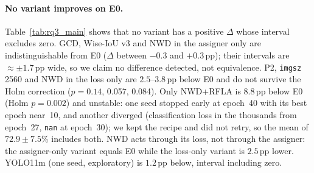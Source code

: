 \paragraph{No variant improves on E0.}
Table~\ref{tab:rq3_main} shows that no variant has a positive $\Delta$ whose interval excludes zero. GCD, Wise-IoU v3 and NWD in the assigner only are indistinguishable from E0 ($\Delta$ between $-0.3$ and $+0.3$\,pp); their intervals are $\approx\pm1.7$\,pp wide, so we claim no difference detected, not equivalence. P2, \texttt{imgsz} 2560 and NWD in the loss only are $2.5$--$3.8$\,pp below E0 and do not survive the Holm correction ($p=0.14$, 0.057, 0.084). Only NWD+RFLA is $8.8$\,pp below E0 (Holm $p=0.002$) and unstable: one seed stopped early at epoch~40 with its best epoch near~10, and another diverged (classification loss in the thousands from epoch~27, \texttt{nan} at epoch~30); we kept the recipe and did not retry, so the mean of $72.9\pm7.5$\% includes both. NWD acts through its loss, not through the assigner: the assigner-only variant equals E0 while the loss-only variant is $2.5$\,pp lower. YOLO11m (one seed, exploratory) is $1.2$\,pp below, interval including zero.

\begin{table}[t]
\centering
\caption{RQ3 on TEST (73 images, 1{,}210 species instances), YOLO26m, L40S campaign; three seeds unless noted. Accuracy: mean$\pm$std. $\Delta$: paired difference to E0 of the same seed in pp, with 95\% bootstrap interval over images; $p$: Holm over the eight three-seed variants (YOLO11m, one seed, is outside the family; its $p$ is not corrected). Recall (\%) by object size $\sqrt{wh}$ ($n=613$, 376, 221). VAL selected \texttt{best.pt} and is not held out; all numbers are TEST.}
\label{tab:rq3_main}
\footnotesize
\setlength{\tabcolsep}{2.5pt}
\end{table}

